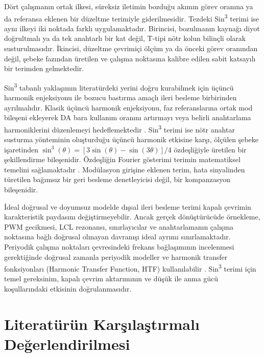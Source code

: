 Dört çalışmanın ortak ilkesi, süreksiz iletimin bozduğu akımın görev oranına ya da referansa eklenen bir düzeltme terimiyle giderilmesidir. Tezdeki Sin\textsuperscript{3} terimi ise aynı ilkeyi iki noktada farklı uygulamaktadır. Birincisi, bozulmanın kaynağı diyot doğrultmalı ya da tek anahtarlı bir kat değil, T-tipi nötr kolun bilinçli olarak susturulmasıdır. İkincisi, düzeltme çevrimiçi ölçüm ya da önceki görev oranından değil, şebeke fazından üretilen ve çalışma noktasına kalibre edilen sabit katsayılı bir terimden gelmektedir.

Sin\textsuperscript{3} tabanlı yaklaşımın literatürdeki yerini doğru kurabilmek için üçüncü harmonik enjeksiyonu ile bozucu bastırma amaçlı ileri besleme birbirinden ayrılmalıdır. Klasik üçüncü harmonik enjeksiyonu, faz referanslarına ortak mod bileşeni ekleyerek DA bara kullanım oranını artırmayı veya belirli anahtarlama harmoniklerini düzenlemeyi hedeflemektedir \citep{Holmes2003,Aghdam2013}. Sin\textsuperscript{3} terimi ise nötr anahtar susturma yönteminin oluşturduğu üçüncü harmonik etkisine karşı, ölçülen şebeke işaretinden $\sin^3(\theta)=[3\sin(\theta)-\sin(3\theta)]/4$ özdeşliğiyle üretilen bir şekillendirme bileşenidir. Özdeşliğin Fourier gösterimi terimin matematiksel temelini sağlamaktadır \citep{Oppenheim1997}. Modülasyon girişine eklenen terim, hata sinyalinden türetilen bağımsız bir geri besleme denetleyicisi değil, bir kompanzasyon bileşenidir.

İdeal doğrusal ve doyumsuz modelde dışsal ileri besleme terimi kapalı çevrimin karakteristik paydasını değiştirmeyebilir. Ancak gerçek dönüştürücüde örnekleme, PWM gecikmesi, LCL rezonansı, sınırlayıcılar ve anahtarlamanın çalışma noktasına bağlı doğrusal olmayan davranışı ideal ayrımı sınırlamaktadır. Periyodik çalışma noktaları çevresindeki frekans bağlaşımının incelenmesi gerektiğinde doğrusal zamanla periyodik modeller ve harmonik transfer fonksiyonları (Harmonic Transfer Function, HTF) kullanılabilir \citep{Wereley1991,Liao2022}. Sin\textsuperscript{3} terimi için temel gereksinim, kapalı çevrim aktarımının ve düşük ile anma gücü koşullarındaki etkisinin doğrulanmasıdır.

\section{Literatürün Karşılaştırmalı Değerlendirilmesi}

